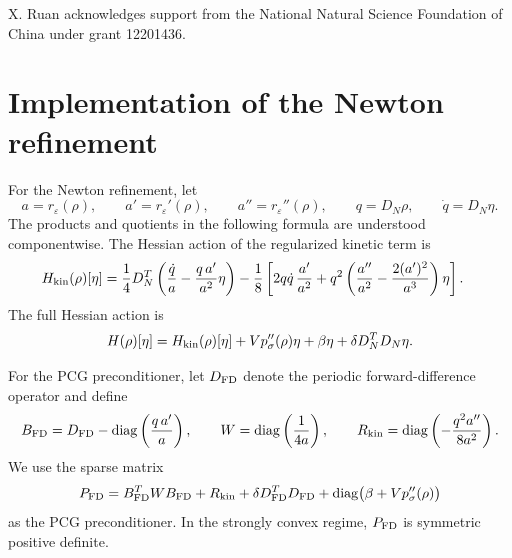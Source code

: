 \documentclass[11pt]{article}
\newcommand{\eps}{\varepsilon}
\newcommand{\sig}{\sigma}
\newcommand{\norm}[1]{\left\|#1\right\|}
\theoremstyle{plain}
\theoremstyle{definition}
\numberwithin{equation}{section}
\begin{document}
\bigskip
{} X. Ruan acknowledges support from the National Natural Science Foundation of China under grant 12201436.




\appendix

%
%

\section{Implementation of the Newton refinement}
\label{app:newton-implementation}

For the Newton refinement, let
\[
a=r_\eps(\rho),\qquad
a'=r_\eps'(\rho),\qquad
a''=r_\eps''(\rho),\qquad
q=D_N\rho,\qquad
\dot q=D_N\eta.
\]
The products and quotients in the following formula are understood
componentwise. The Hessian action of the regularized kinetic term is
\begin{align}
\label{eq:hessian-action}
H_{\rm kin}(\rho)[\eta]
={}&
\frac14D_N^T
\left(
\frac{\dot q}{a}
-
\frac{q\,a'}{a^2}\eta
\right)
-
\frac18
\left[
2q\dot q\,\frac{a'}{a^2}
+
q^2
\left(
\frac{a''}{a^2}
-
\frac{2(a')^2}{a^3}
\right)\eta
\right].
\end{align}
The full Hessian action is
\begin{equation}
\label{eq:full-hessian-action}
H(\rho)[\eta]
=
H_{\rm kin}(\rho)[\eta]
+
Vp_\sig''(\rho)\eta
+
\beta\eta
+
\delta D_N^TD_N\eta.
\end{equation}

For the PCG preconditioner, let $D_{\rm FD}$ denote the periodic
forward-difference operator and define
\[
B_{\rm FD}
=
D_{\rm FD}
-
\operatorname{diag}\left(\frac{q\,a'}{a}\right),
\qquad
W
=
\operatorname{diag}\left(\frac{1}{4a}\right),
\qquad
R_{\rm kin}
=
\operatorname{diag}\left(
-\frac{q^2a''}{8a^2}
\right).
\]
We use the sparse matrix
\begin{equation}
\label{eq:fd-preconditioner}
P_{\rm FD}
=
B_{\rm FD}^TWB_{\rm FD}
+
R_{\rm kin}
+
\delta D_{\rm FD}^TD_{\rm FD}
+
\operatorname{diag}\bigl(\beta+Vp_\sig''(\rho)\bigr)
\end{equation}
as the PCG preconditioner. In the strongly convex regime,
$P_{\rm FD}$ is symmetric positive definite.
\end{document}
